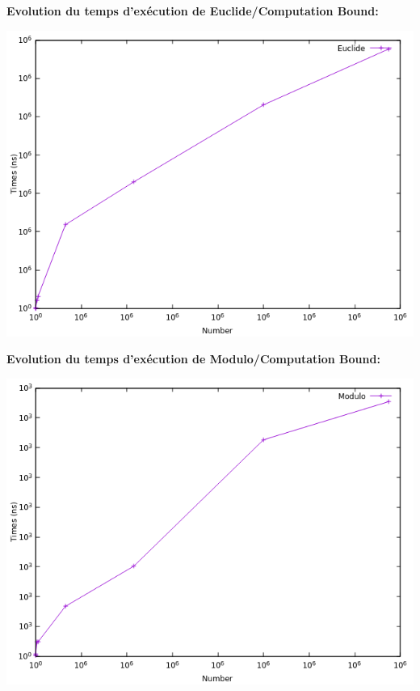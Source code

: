 		\begin{frame}
		\textbf{Evolution du temps d'exécution de Euclide/Computation Bound: }
		\begin{center}\includegraphics[scale=0.5]{euclide.png}\end{center}
		\end{frame}
		
		\begin{frame}
		\textbf{Evolution du temps d'exécution de Modulo/Computation Bound: }
		\begin{center}\includegraphics[scale=0.5]{modulo.png}\end{center}
		\end{frame}
		
